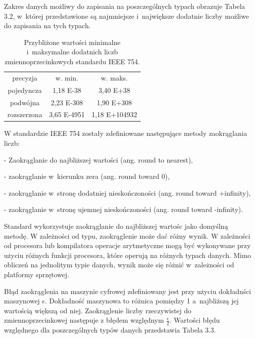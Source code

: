 Zakres danych możliwy do zapisania na poszczególnych typach obrazuje Tabela 3.2, w~której przedstawione są najmniejsze i~największe dodatnie liczby możliwe do zapisania na tych typach.

\begin{table}[h]
        \centering
        \begin{threeparttable}
                \caption{Przybliżone wartości minimalne i~maksymalne dodatnich liczb zmiennoprzecinkowych standardu IEEE 754.}\label{tab:table_exampleazd}
                \begin{tabularx}{0.6\textwidth}{| c | c | c |}
                        \midrule
                        	precyzja	&	w. min. & w. maks. \\
		pojedyncza  & 1,18 E-38 & 3,40 E+38 \\
                        podwójna  & 2,23 E-308 & 1,90 E+308 \\
		rozszerzona &  3,65 E-4951 & 1,18 E+104932 \\
                        \bottomrule
                \end{tabularx}
        \end{threeparttable}
\end{table}

W standardzie IEEE 754 zostały zdefiniowane następujące metody zaokrąglania liczb:

- Zaokrąglanie do najbliższej wartości (ang. round to nearest),

- zaokrąglanie w~kierunku zera (ang. round toward 0),

- zaokrąglanie w~stronę dodatniej nieskończoności (ang. round toward +infinity),

- zaokrąglanie w~stronę ujemnej nieskończoności (ang. round toward -infinity).

Standard wykorzystuje zaokrąglanie do najbliższej wartośc jako domyślną metodę. W zależności od typu, zaokrąglenie może dać różny wynik. W zależności od procesora lub kompilatora operacje arytmetyczne mogą być wykonywane przy użyciu różnych funkcji procesora, które operują na różnych typach danych. Mimo obliczeń na jednolitym typie danych, wynik może się różnić w~zależności od platformy sprzętowej.

Błąd zaokrąglenia na maszynie cyfrowej zdefiniowany jest przy użyciu dokładnści maszynowej $\epsilon$. Dokładność maszynowa to różnica pomiędzy 1 a~najbliższą jej wartością większą od niej. Zaokrąglenie liczby rzeczywistej do zmiennoprzecinkowej następuje z błędem względnym $\frac{\epsilon}{2}$. Wartości błędu względnego dla poszczególnych typów danych przedstawia Tabela 3.3. 

